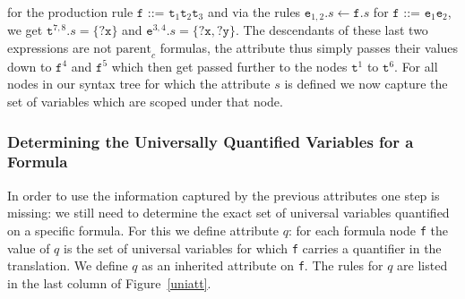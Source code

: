 for the production rule
$\texttt{f ::= t}_1\texttt{t}_2\texttt{t}_3$
and via the rules $\texttt{e}_{1,2}.s\leftarrow \texttt{f}.s$ for $\texttt{f ::= e}_1\texttt{e}_2$, we get $\texttt{t}^{7,8}.s= \{\texttt{?x}\}$ and
 $\texttt{e}^{3,4}.s=\{\texttt{?x},\texttt{?y}\}$. %
The descendants of these last two expressions are not $\text{parent}_c$ formulas, the attribute thus simply passes their values down to $\texttt{f}^4$ and $\texttt{f}^5$ which then get passed further to
the nodes
 $\texttt{t}^1$ to $\texttt{t}^6$. %
For all nodes in our syntax tree for which the attribute $s$ is defined we now capture the set of variables which are scoped under that node.



\subsubsection{Determining the Universally Quantified Variables for a Formula }
In order to use the information captured by the previous attributes one step is missing: we still need to determine the exact set of universal variables quantified
on a specific formula. For this we define attribute $q$:  %
for each formula node \texttt{f} the value of $q$ is  
the set of universal variables 
for which \texttt{f} carries a quantifier in the translation. We define $q$ as an inherited attribute on \texttt{f}. The rules for $q$ are listed
in the last column of Figure~\ref{uniatt}. 

